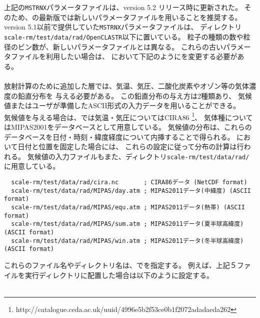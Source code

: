 上記の\verb|MSTRNX|パラメータファイルは、version 5.2 リリース時に更新された。
そのため、{\scalerm}の最新版では新しいパラメータファイルを用いることを推奨する。
version 5.1以前で提供していた\verb|MSTRNX|パラメータファイルは、
ディレクトリ\verb|scale-rm/test/data/rad/OpenCLASTR|以下に置いている。
粒子の種類の数や粒径のビン数が、新しいパラメータファイルとは異なる。
これらの古いパラメータファイルを利用したい場合は、
において下記のようにを変更する必要がある。\\

\\

放射計算のために追加した層では、気温、気圧、二酸化炭素やオゾン等の気体濃度の鉛直分布を
与える必要がある。
この鉛直分布の与え方は2種類あり、
気候値またはユーザが準備したASCII形式の入力データを用いることができる。\\

気候値を与える場合は、\scalerm では気温・気圧についてはCIRA86
\footnote{http://catalogue.ceda.ac.uk/uuid/4996e5b2f53ce0b1f2072adadaeda262}\citep{CSR_2006}、
気体種についてはMIPAS2001\citep{Remedios_2007}をデータベースとして用意している。
気候値の分布は、これらのデータベースを日付・時刻・緯度経度について内挿することで得られる。
において日付と位置を固定した場合には、
これらの設定に従って分布の計算は行われる。
気候値の入力ファイルもまた、ディレクトリ\verb|scale-rm/test/data/rad/|に用意している。
\begin{verbatim}
  scale-rm/test/data/rad/cira.nc       ; CIRA86データ (NetCDF format)
  scale-rm/test/data/rad/MIPAS/day.atm ; MIPAS2011データ(中緯度) (ASCII format)
  scale-rm/test/data/rad/MIPAS/equ.atm ; MIPAS2011データ(熱帯) (ASCII format)
  scale-rm/test/data/rad/MIPAS/sum.atm ; MIPAS2011データ(夏半球高緯度) (ASCII format)
  scale-rm/test/data/rad/MIPAS/win.atm ; MIPAS2011データ(冬半球高緯度) (ASCII format)
\end{verbatim}
これらのファイル名やディレクトリ名は、でを指定する。
例えば、上記５ファイルを実行ディレクトリに配置した場合は以下のように設定する。\\

\\

